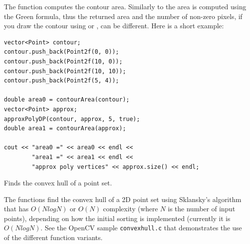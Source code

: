 The function computes the contour area. Similarly to  the area is computed using the Green formula, thus the returned area and the number of non-zero pixels, if you draw the contour using  or , can be different.
Here is a short example:

\begin{lstlisting}
vector<Point> contour;
contour.push_back(Point2f(0, 0));
contour.push_back(Point2f(10, 0));
contour.push_back(Point2f(10, 10));
contour.push_back(Point2f(5, 4));

double area0 = contourArea(contour);
vector<Point> approx;
approxPolyDP(contour, approx, 5, true);
double area1 = contourArea(approx);

cout << "area0 =" << area0 << endl <<
        "area1 =" << area1 << endl <<
        "approx poly vertices" << approx.size() << endl; 
\end{lstlisting}

Finds the convex hull of a point set.

\begin{description}
\end{description}

The functions find the convex hull of a 2D point set using Sklansky's algorithm \cite{Sklansky82} that has $O(N logN)$ or $O(N)$ complexity (where $N$ is the number of input points), depending on how the initial sorting is implemented (currently it is $O(N logN)$. See the OpenCV sample \texttt{convexhull.c} that demonstrates the use of the different function variants. 


